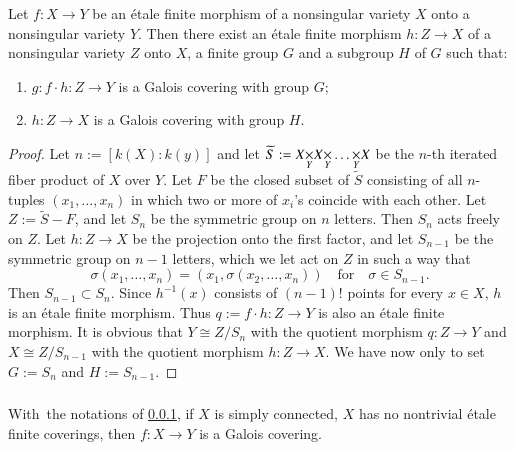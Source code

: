 \subsubsection{}\label{chap2:3.6.2}
\begin{lemma*}
  Let $f:X\to Y$ be an \'etale finite morphism of a nonsingular variety
  $X$ onto a nonsingular variety $Y$. Then there exist an \'etale finite
  morphism $h:Z\to X$ of a nonsingular variety $Z$ onto $X$, a finite
  group $G$ and a subgroup $H$ of $G$ such that:
  \begin{enumerate}
    \renewcommand{\labelenumi}{\rm(\theenumi)}
  \item $g:f\cdot h:Z\to Y$ is a Galois covering with group $G$;
    
  \item $h:Z\to X$ is a Galois covering with group $H$.
  \end{enumerate}
\end{lemma*}

\begin{proof}
Let $n:=[k(X):k(y)]$ and let
$\widetilde{S}:=\fprod{\fprod{\fprod{X}{X}{Y}}{\ldots}{Y}}{X}{Y}$ be
the $n$-th iterated fiber product of $X$ over $Y$. Let $F$ be the
closed subset of $\widetilde{S}$ consisting of all $n$-tuples
$(x_{1},\ldots,x_{n})$ in which two or more of $x_{i}$'s coincide with
each other. Let $Z:=\widetilde{S}-F$, and let $S_{n}$ be the symmetric
group on $n$ letters. Then $S_{n}$ acts freely on $Z$. Let $h:Z\to X$
be the projection onto the first factor, and let $S_{n-1}$ be the
symmetric group on $n-1$ letters, which we let act on $Z$ in such a
way that
$$
\sigma(x_{1},\ldots,x_{n})=(x_{1},\sigma(x_{2},\ldots,x_{n}))\quad\text{for}\quad
\sigma\in S_{n-1}. 
$$
Then $S_{n-1}\subset S_{n}$. Since $h^{-1}(x)$ consists of $(n-1)!$
points for every $x\in X$, $h$ is an \'etale finite morphism. Thus
$q:=f\cdot h:Z\to Y$ is also an \'etale finite morphism. It is obvious
that $Y\cong Z/S_{n}$ with the quotient morphism $q:Z\to Y$ and
$X\cong Z/S_{n-1}$ with the quotient morphism $h:Z\to X$. We have now
only to set $G:=S_{n}$ and $H:=S_{n-1}$.
\end{proof}

\subsubsection{}\label{chap2:3.6.3}
\begin{lemma*}
  With\pageoriginale\ the notations of \ref{chap2:3.6.2}, if $X$ is simply
  connected, \iec 
  $X$ has no nontrivial \'etale finite coverings, then $f:X\to Y$ is a
  Galois covering.
\end{lemma*}

